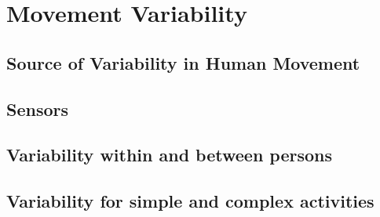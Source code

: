 
\chapter{Movement Variability}

\ifpdf
    \graphicspath{{Chapter2/Figs/Raster/}{Chapter2/Figs/PDF/}{Chapter2/Figs/}}
\else
    \graphicspath{{Chapter2/Figs/Vector/}{Chapter2/Figs/}}
\fi


\section{Source of Variability in Human Movement}
\section{Sensors}
\section{Variability within and between persons}
\section{Variability for simple and complex activities}
